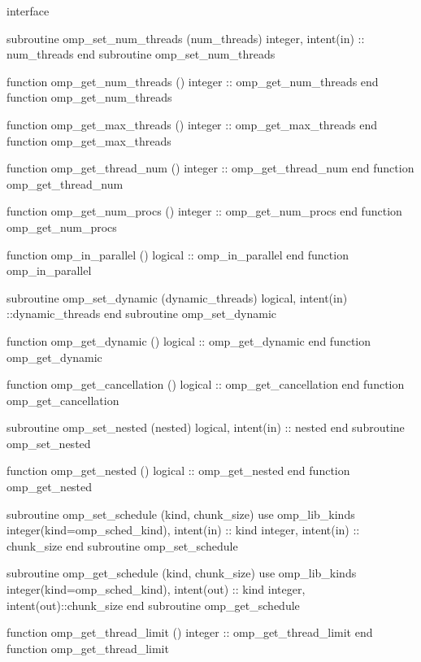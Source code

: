 {{\begin{codepar}
         interface

          subroutine omp\_set\_num\_threads (num\_threads)
           integer, intent(in) :: num\_threads
          end subroutine omp\_set\_num\_threads

          function omp\_get\_num\_threads ()
           integer :: omp\_get\_num\_threads
          end function omp\_get\_num\_threads

          function omp\_get\_max\_threads ()
           integer :: omp\_get\_max\_threads
          end function omp\_get\_max\_threads

          function omp\_get\_thread\_num ()
           integer :: omp\_get\_thread\_num
          end function omp\_get\_thread\_num

          function omp\_get\_num\_procs ()
           integer :: omp\_get\_num\_procs
          end function omp\_get\_num\_procs

          function omp\_in\_parallel ()
           logical :: omp\_in\_parallel
          end function omp\_in\_parallel

          subroutine omp\_set\_dynamic (dynamic\_threads)
           logical, intent(in) ::dynamic\_threads
          end subroutine omp\_set\_dynamic

          function omp\_get\_dynamic ()
           logical :: omp\_get\_dynamic
          end function omp\_get\_dynamic

          function omp\_get\_cancellation ()
           logical :: omp\_get\_cancellation
          end function omp\_get\_cancellation

          subroutine omp\_set\_nested (nested)
           logical, intent(in) :: nested
          end subroutine omp\_set\_nested

          function omp\_get\_nested ()
           logical :: omp\_get\_nested
          end function omp\_get\_nested

          subroutine omp\_set\_schedule (kind, chunk\_size)
           use omp\_lib\_kinds
           integer(kind=omp\_sched\_kind), intent(in) :: kind
           integer, intent(in) :: chunk\_size
          end subroutine omp\_set\_schedule

          subroutine omp\_get\_schedule (kind, chunk\_size)
           use omp\_lib\_kinds
           integer(kind=omp\_sched\_kind), intent(out) :: kind
           integer, intent(out)::chunk\_size
          end subroutine omp\_get\_schedule

          function omp\_get\_thread\_limit ()
           integer :: omp\_get\_thread\_limit
          end function omp\_get\_thread\_limit


\end{codepar}}}
